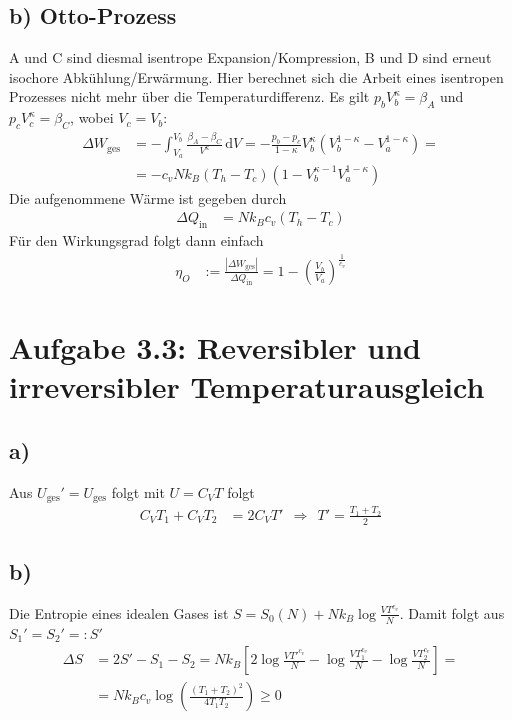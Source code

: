 \documentclass[a4paper,12pt]{article}
\newcommand{\intx}{}
\newcommand{\kla}{}
\newcommand{\klam}{}
\newcommand{\tecxt}{}
\begin{document}
\subsection*{b) Otto-Prozess}
A und C sind diesmal isentrope Expansion/Kompression, B und D sind erneut isochore Abkühlung/Erwärmung. Hier berechnet sich die Arbeit eines isentropen Prozesses nicht mehr über die Temperaturdifferenz. Es gilt $p_bV_b^\kappa=\beta_A$ und $p_cV_c^\kappa=\beta_C$, wobei $V_c=V_b$:
\begin{align*}
\Delta W_\tecxt\text{ges}&=-\intx\int_{V_a}^{V_b}\frac{\beta_A-\beta_C}{V^{\kappa}}\,\mathrm{d}V=-\frac{p_b-p_c}{1-\kappa}V_b^\kappa\kla\left( {V_b^{1-\kappa}-V_a^{1-\kappa}} \right)=\\
&=-c_vNk_B(T_h-T_c)\kla\left( {1-V_b^{\kappa-1}V_a^{1-\kappa}} \right)
\end{align*}
Die aufgenommene Wärme ist gegeben durch
\begin{align*}
\Delta Q_\tecxt\text{in}&=Nk_Bc_v(T_h-T_c)
\end{align*}
Für den Wirkungsgrad folgt dann einfach
\begin{align*}
\eta_O&:=\frac{|\Delta W_\tecxt\text{ges}|}{\Delta Q_\tecxt\text{in}}=1-\kla\left( {\frac{V_b}{V_a}} \right)^\frac{1}{c_v}
\end{align*}
\section*{Aufgabe 3.3: Reversibler und irreversibler Temperaturausgleich}
\subsection*{a)}Aus $U_\tecxt\text{ges}'=U_\tecxt\text{ges}$ folgt mit $U=C_VT$ folgt
\begin{align*}
C_VT_1+C_VT_2&=2C_VT'\ \ \Rightarrow\ \ T'=\frac{T_1+T_2}{2}
\end{align*}
\subsection*{b)}Die Entropie eines idealen Gases ist $S=S_0(N)+Nk_B\log\frac{VT^{c_v}}{N}$. Damit folgt aus $S_1'=S_2'=:S'$
\begin{align*}
\Delta S&=2S'-S_1-S_2=Nk_B\klam\left[ {2\log\frac{VT'^{c_v}}{N}-\log\frac{VT_1^{c_v}}{N}-\log\frac{VT_2^{c_v}}{N}} \right]=\\
&=Nk_Bc_v\log\kla\left( {\frac{(T_1+T_2)^2}{4T_1T_2}} \right)\ge 0
\end{align*}
\end{document}
